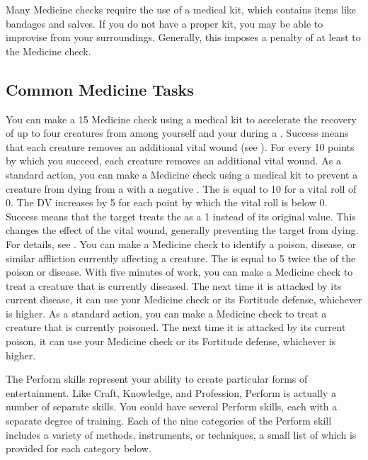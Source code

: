   Many Medicine checks require the use of a medical kit, which contains items like bandages and salves.
  If you do not have a proper kit, you may be able to improvise from your surroundings.
  Generally, this imposes a penalty of at least  to the Medicine check.

  \subsection{Common Medicine Tasks}
    You can make a  15 Medicine check using a medical kit to accelerate the recovery of up to four creatures from among yourself and your  during a .
    Success means that each creature removes an additional vital wound (see ).
    For every 10 points by which you succeed, each creature removes an additional vital wound.
    As a standard action, you can make a Medicine check using a medical kit to prevent a creature from dying from a  with a negative .
    The  is equal to 10 for a vital roll of 0.
    The DV increases by 5 for each point by which the vital roll is below 0.
    Success means that the target treats the  as a 1 instead of its original value.
    This changes the effect of the vital wound, generally preventing the target from dying.
    For details, see .
    You can make a Medicine check to identify a poison, disease, or similar affliction currently affecting a creature.
    The  is equal to 5 \add twice the  of the poison or disease.
     With five minutes of work, you can make a Medicine check to treat a creature that is currently diseased.
    The next time it is attacked by its current disease, it can use your Medicine check or its Fortitude defense, whichever is higher.
     As a standard action, you can make a Medicine check to treat a creature that is currently poisoned.
    The next time it is attacked by its current poison, it can use your Medicine check or its Fortitude defense, whichever is higher.

\newpage
{}
  The Perform skills represent your ability to create particular forms of entertainment.
  Like Craft, Knowledge, and Profession, Perform is actually a number of separate skills.
  You could have several Perform skills, each with a separate degree of training.
  Each of the nine categories of the Perform skill includes a variety of methods, instruments, or techniques, a small list of which is provided for each category below.

